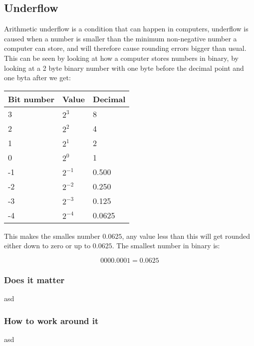 \subsection{Underflow}
    Arithmetic underflow is a condition that can happen in computers, underflow is caused when a number is smaller than the minimum non-negative number a computer can store, and will therefore cause rounding errors bigger than usual. This can be seen by looking at how a computer stores numbers in binary, by looking at a 2 byte binary number with one byte before the decimal point and one byta after we get:\\

\begin{table}[!h]
    \begin{tabular}{|l|l|l|}
        \hline
        Bit number & Value    & Decimal \\ \hline
        3          & $2^3$    & 8       \\ 
        2          & $2^2$    & 4       \\ 
        1          & $2^1$    & 2       \\ 
        0          & $2^0$    & 1       \\ 
        -1         & $2^{-1}$ & 0.500   \\ 
        -2         & $2^{-2}$ & 0.250   \\ 
        -3         & $2^{-3}$ & 0.125   \\ 
        -4         & $2^{-4}$ & 0.0625  \\
        \hline
    \end{tabular}
\end{table}

    This makes the smalles number $0.0625$, any value less than this will get rounded either down to zero or up to $0.0625$. The smallest number in binary is:

    $$0000.0001 = 0.0625$$

\subsubsection{Does it matter}
asd

\subsubsection{How to work around it}
asd
